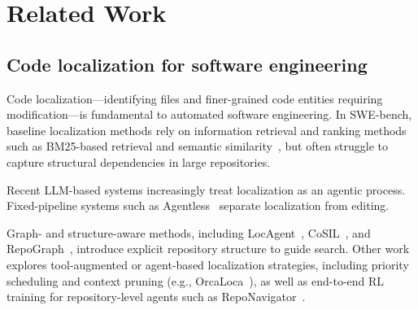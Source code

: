 \section{Related Work}







\subsection{Code localization for software engineering}
Code localization---identifying files and finer-grained code entities requiring modification---is fundamental to automated software engineering. In SWE-bench, baseline localization methods rely on information retrieval and ranking methods such as BM25-based retrieval and semantic similarity~\citep{jimenez2024swebenchlanguagemodelsresolve}, but often struggle to capture structural dependencies in large repositories.

Recent LLM-based systems increasingly treat localization as an agentic process. Fixed-pipeline systems such as Agentless~\citep{xia2024agentlessdemystifyingllmbasedsoftware} separate localization from editing.

Graph- and structure-aware methods, including LocAgent~\citep{chen-etal-2025-locagent}, CoSIL~\citep{liu2025cosil}, and RepoGraph~\citep{ouyang2025repographenhancingaisoftware}, introduce explicit repository structure to guide search. Other work explores tool-augmented or agent-based localization strategies, including priority scheduling and context pruning (e.g., OrcaLoca~\citep{yu2025orcalocallmagentframework}), as well as end-to-end RL training for repository-level agents such as RepoNavigator~\citep{zhang2026toolenoughreinforcementlearning}.

